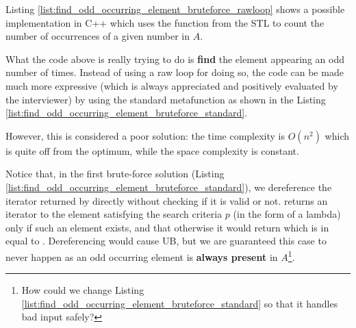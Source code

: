 Listing \ref{list:find_odd_occurring_element_bruteforce_rawloop} shows a possible implementation in C++ which uses the  function from the STL to count the number of occurrences of a given number in $A$.




What the code above is really trying to do is \textbf{find} the element appearing an odd number of times.
Instead of using a raw loop for doing so, the code can be made much more expressive (which is always appreciated and positively evaluated by the interviewer) by using the standard  metafunction  as shown in the Listing \ref{list:find_odd_occurring_element_bruteforce_standard}.




However, this is considered a poor solution: the time complexity is $O(n^2)$ which is quite off from the optimum, while the space complexity is constant. 


Notice that, in the first brute-force solution (Listing \ref{list:find_odd_occurring_element_bruteforce_standard}), we dereference the iterator returned by  directly without checking if it is valid or not. 
 returns an iterator to the element satisfying the search criteria $p$ (in the form of a lambda)  only if such an element exists, and that otherwise it would return  which is in  equal to .
Dereferencing  would cause UB, but we are guaranteed this case to never happen as an odd occurring element is \textbf{always present} in $A$\footnote{How could we change Listing \ref{list:find_odd_occurring_element_bruteforce_standard} so that it handles bad input safely?}.


